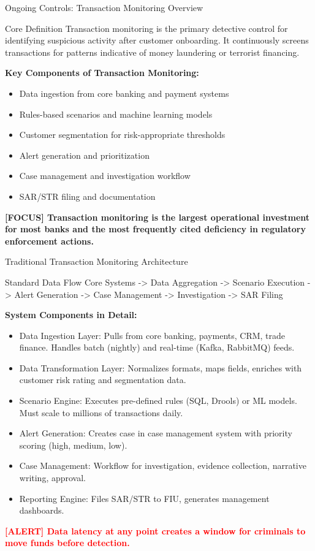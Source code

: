 \documentclass[11pt,a4paper]{beamer}
\newcommand{\redflag}[1]{\textcolor{red}{\textbf{[ALERT] #1}}}
\newcommand{\examfocus}[1]{\textcolor{orange!80!black}{\textbf{[FOCUS] #1}}}
\begin{document}
	\begin{frame}{Ongoing Controls: Transaction Monitoring Overview}
		\begin{block}{Core Definition}
			Transaction monitoring is the primary detective control for identifying suspicious activity after customer onboarding. It continuously screens transactions for patterns indicative of money laundering or terrorist financing.
		\end{block}
		
		\textbf{Key Components of Transaction Monitoring:}
		\begin{itemize}
			\item Data ingestion from core banking and payment systems
			\item Rules-based scenarios and machine learning models
			\item Customer segmentation for risk-appropriate thresholds
			\item Alert generation and prioritization
			\item Case management and investigation workflow
			\item SAR/STR filing and documentation
		\end{itemize}
		
		\examfocus{Transaction monitoring is the largest operational investment for most banks and the most frequently cited deficiency in regulatory enforcement actions.}
	\end{frame}
	
	\begin{frame}{Traditional Transaction Monitoring Architecture}
		\begin{block}{Standard Data Flow}
			Core Systems -> Data Aggregation -> Scenario Execution -> Alert Generation -> Case Management -> Investigation -> SAR Filing
		\end{block}
		
		\textbf{System Components in Detail:}
		\begin{itemize}
			\item Data Ingestion Layer: Pulls from core banking, payments, CRM, trade finance. Handles batch (nightly) and real-time (Kafka, RabbitMQ) feeds.
			\item Data Transformation Layer: Normalizes formats, maps fields, enriches with customer risk rating and segmentation data.
			\item Scenario Engine: Executes pre-defined rules (SQL, Drools) or ML models. Must scale to millions of transactions daily.
			\item Alert Generation: Creates case in case management system with priority scoring (high, medium, low).
			\item Case Management: Workflow for investigation, evidence collection, narrative writing, approval.
			\item Reporting Engine: Files SAR/STR to FIU, generates management dashboards.
		\end{itemize}
		
		\redflag{Data latency at any point creates a window for criminals to move funds before detection.}
	\end{frame}
	
\end{document}
